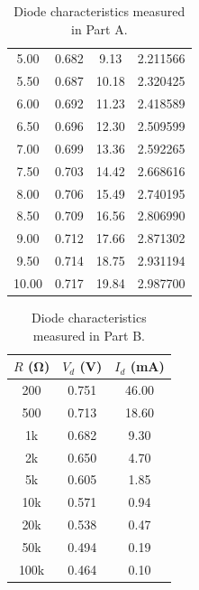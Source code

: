 \documentclass{article}
\begin{document}
\begin{table}[hbtp]
\begin{tabular}{cccc}
    5.00 & 0.682 & 9.13 & 2.211566 \\
    5.50 & 0.687 & 10.18 & 2.320425 \\
    6.00 & 0.692 & 11.23 & 2.418589 \\
    6.50 & 0.696 & 12.30 & 2.509599 \\
    7.00 & 0.699 & 13.36 & 2.592265 \\
    7.50 & 0.703 & 14.42 & 2.668616 \\
    8.00 & 0.706 & 15.49 & 2.740195 \\
    8.50 & 0.709 & 16.56 & 2.806990 \\
    9.00 & 0.712 & 17.66 & 2.871302 \\
    9.50 & 0.714 & 18.75 & 2.931194 \\
    10.00 & 0.717 & 19.84 & 2.987700 \\
  \end{tabular}
  \caption{\label{tab:part_a} Diode characteristics measured in Part A.}
\end{table}

\begin{table}[hbtp]
  \centering
  \begin{tabular}{ccc}
    $R$ (\si{\ohm}) & $V_d$ (\si{V}) & $I_d$ (\si{mA}) \\
    \hline
    200 & 0.751 & 46.00 \\
    500 & 0.713 & 18.60 \\
    1k & 0.682 & 9.30 \\
    2k & 0.650 & 4.70 \\
    5k & 0.605 & 1.85 \\
    10k & 0.571 & 0.94 \\
    20k & 0.538 & 0.47 \\
    50k & 0.494 & 0.19 \\
    100k & 0.464 & 0.10 \\
  \end{tabular}
  \caption{\label{tab:part_b} Diode characteristics measured in Part B.}
\end{table}
\end{document}
